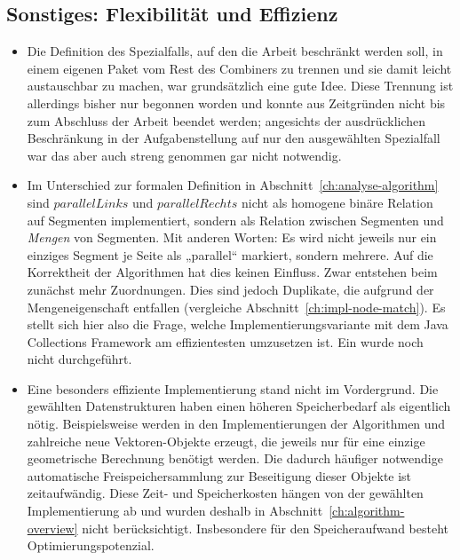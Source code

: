 \documentclass[../main/thesis.tex]{subfiles}
\begin{document}
\subsection{Sonstiges: Flexibilität und Effizienz}

\begin{itemize}

\label{ch:impl-special-case}
\item
Die Definition des Spezialfalls, auf den die Arbeit beschränkt werden soll, in einem eigenen Paket  vom Rest des Combiners zu trennen und sie damit leicht austauschbar zu machen, war grundsätzlich eine gute Idee.
Diese Trennung ist allerdings bisher nur begonnen worden und konnte aus Zeitgründen nicht bis zum Abschluss der Arbeit beendet werden; angesichts der ausdrücklichen Beschränkung in der Aufgabenstellung auf nur den ausgewählten Spezialfall war das aber auch streng genommen gar nicht notwendig.

\item
Im Unterschied zur formalen Definition in Abschnitt~\ref{ch:analyse-algorithm} sind $parallelLinks$ und $parallelRechts$ nicht als homogene binäre Relation auf Segmenten implementiert, sondern als Relation zwischen Segmenten und \emph{Mengen} von Segmenten.
Mit anderen Worten: Es wird nicht jeweils nur ein einziges Segment je Seite als „parallel“ markiert, sondern mehrere.
Auf die Korrektheit der Algorithmen hat dies keinen Einfluss.
Zwar entstehen beim  zunächst mehr Zuordnungen.
Dies sind jedoch Duplikate, die aufgrund der Mengeneigenschaft entfallen (vergleiche Abschnitt~\ref{ch:impl-node-match}).
Es stellt sich hier also die Frage, welche Implementierungsvariante mit dem Java Collections Framework am effizientesten umzusetzen ist.
Ein  wurde noch nicht durchgeführt.

\item
Eine besonders effiziente Implementierung stand nicht im Vordergrund.
Die gewählten Datenstrukturen haben einen höheren Speicherbedarf als eigentlich nötig.
Beispielsweise werden in den Implementierungen der Algorithmen  und  zahlreiche neue Vektoren-Objekte erzeugt, die jeweils nur für eine einzige geometrische Berechnung benötigt werden.
Die dadurch häufiger notwendige automatische Freispeichersammlung  zur Beseitigung dieser Objekte ist zeitaufwändig.
Diese Zeit- und Speicherkosten hängen von der gewählten Implementierung ab und wurden deshalb in Abschnitt~\ref{ch:algorithm-overview} nicht berücksichtigt.
Insbesondere für den Speicheraufwand besteht Optimierungspotenzial.


\end{itemize}
\end{document}
